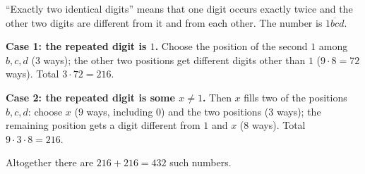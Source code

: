 ``Exactly two identical digits'' means that one digit occurs exactly twice and the other two digits are different from it and from each other. The number is $\overline{1bcd}$.

\textbf{Case 1: the repeated digit is $1$.} Choose the position of the second $1$ among $b,c,d$ ($3$ ways); the other two positions get different digits other than $1$ ($9\cdot8=72$ ways). Total $3\cdot72=216$.

\textbf{Case 2: the repeated digit is some $x\ne1$.} Then $x$ fills two of the positions $b,c,d$: choose $x$ ($9$ ways, including $0$) and the two positions ($3$ ways); the remaining position gets a digit different from $1$ and $x$ ($8$ ways). Total $9\cdot3\cdot8=216$.

Altogether there are $216+216=\boxed{432}$ such numbers.
